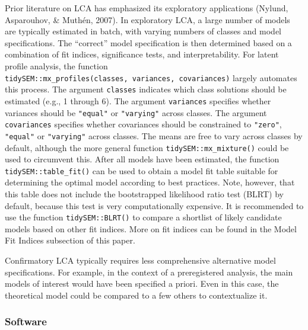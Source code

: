 \documentclass[
  ,man,floatsintext]{apa6}
\begin{document}
Prior literature on LCA has emphasized its exploratory applications
(Nylund, Asparouhov, \& Muthén, 2007).
In exploratory LCA,
a large number of models are typically estimated in batch,
with varying numbers of classes and model specifications.
The ``correct'' model specification is then determined
based on a combination of fit indices,
significance tests, and interpretability.
For latent profile analysis,
the function \texttt{tidySEM::mx\_profiles(classes,\ variances,\ covariances)}
largely automates this process.
The argument \texttt{classes} indicates which
class solutions should be estimated (e.g., 1 through 6).
The argument \texttt{variances} specifies whether
variances should be \texttt{"equal"} or \texttt{"varying"} across classes.
The argument \texttt{covariances} specifies whether
covariances should be constrained to
\texttt{"zero"}, \texttt{"equal"} or \texttt{"varying"} across classes.
The means are free to vary across classes by default,
although the more general function \texttt{tidySEM::mx\_mixture()}
could be used to circumvent this.
After all models have been estimated,
the function \texttt{tidySEM::table\_fit()} can be used
to obtain a model fit table suitable for
determining the optimal model according to best practices.
Note, however, that this table does not include
the bootstrapped likelihood ratio test (BLRT) by default,
because this test is very computationally expensive.
It is recommended to use the function \texttt{tidySEM::BLRT()}
to compare a shortlist of likely candidate models
based on other fit indices.
More on fit indices can be found in
the Model Fit Indices subsection of this paper.

Confirmatory LCA typically requires
less comprehensive alternative model specifications.
For example, in the context of a preregistered analysis,
the main models of interest would have been specified a priori.
Even in this case,
the theoretical model could be compared to a few others to contextualize it.

\hypertarget{software}{%
\subsubsection{Software}\label{software}}
\end{document}
